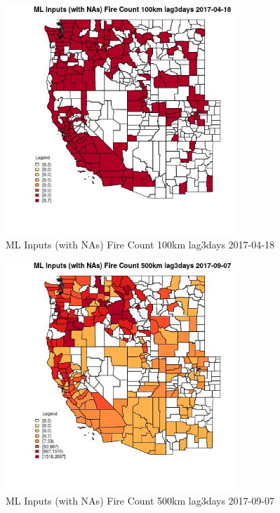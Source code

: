 \begin{figure} 
\centering  
\includegraphics[width=0.77\textwidth]{Code_Outputs/Report_ML_input_PM25_Step4_part_e_de_duplicated_aves_compiled_2019-05-20wNAs_CountyFire_Count_100km_lag3daysMean2017-04-18.jpg} 
\caption{\label{fig:Report_ML_input_PM25_Step4_part_e_de_duplicated_aves_compiled_2019-05-20wNAsCountyFire_Count_100km_lag3daysMean2017-04-18}ML Inputs (with NAs) Fire Count 100km lag3days 2017-04-18} 
\end{figure} 
 

\clearpage 

\begin{figure} 
\centering  
\includegraphics[width=0.77\textwidth]{Code_Outputs/Report_ML_input_PM25_Step4_part_e_de_duplicated_aves_compiled_2019-05-20wNAs_CountyFire_Count_500km_lag3daysMean2017-09-07.jpg} 
\caption{\label{fig:Report_ML_input_PM25_Step4_part_e_de_duplicated_aves_compiled_2019-05-20wNAsCountyFire_Count_500km_lag3daysMean2017-09-07}ML Inputs (with NAs) Fire Count 500km lag3days 2017-09-07} 
\end{figure} 
 

